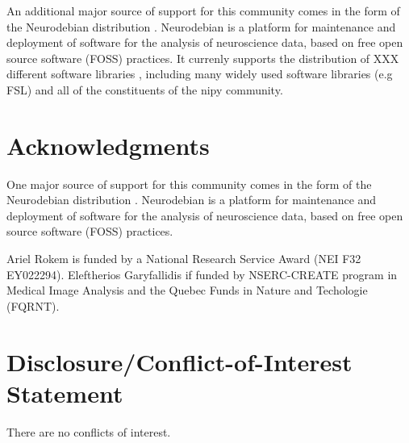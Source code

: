 \documentclass{bioinfo}
\begin{document}
An additional major source of support for this community comes in the form of the
Neurodebian distribution \citep{Halchenko2012}. Neurodebian is a platform for
maintenance and deployment of software for the analysis of neuroscience data,
based on free open source software (FOSS) practices. It currenly supports the
distribution of XXX different software libraries , including many widely used
software libraries (e.g FSL) and all of the constituents of the nipy community.

\section*{Acknowledgments}
One major source of support for this community comes in the form of the Neurodebian
distribution \citep{Halchenko2012}. Neurodebian is a platform for maintenance
and deployment of software for the analysis of neuroscience data, based on free
open source software (FOSS) practices.

Ariel Rokem is funded by a National Research Service Award (NEI F32 EY022294).
Eleftherios Garyfallidis if funded by NSERC-CREATE program in Medical
Image Analysis and the Quebec Funds in Nature and Techologie (FQRNT).

\section*{Disclosure/Conflict-of-Interest Statement}
There are no conflicts of interest.





\end{document}
